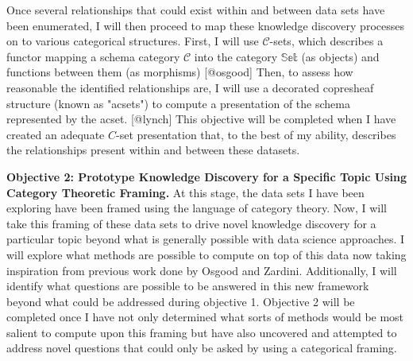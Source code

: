 \documentclass[11pt]{extarticle}
\begin{document}
Once several relationships that could exist within and between data sets have been enumerated, I will then proceed to map these knowledge discovery processes on to various categorical structures.
First, I will use $\mathscr{C}$-sets, which describes a functor mapping a schema category $\mathscr{C}$ into the category $\mathbb{Set}$ (as objects) and functions between them (as morphisms) [@osgood] %
Then, to assess how reasonable the identified relationships are, I will use a decorated copresheaf structure (known as "acsets") to compute a presentation of the schema represented by the acset. [@lynch]
This objective will be completed when I have created an adequate $C$-set presentation that, to the best of my ability, describes the relationships present within and between these datasets.


\textbf{Objective 2: Prototype Knowledge Discovery for a Specific Topic Using Category Theoretic Framing.} At this stage, the data sets I have been exploring have been framed using the language of category theory.
Now, I will take this framing of these data sets to drive novel knowledge discovery for a particular topic beyond what is generally possible with data science approaches.
I will explore what methods are possible to compute on top of this data now taking inspiration from previous work done by Osgood and Zardini. %
Additionally, I will identify what questions are possible to be answered in this new framework beyond what could be addressed during objective 1.
Objective 2 will be completed once I have not only determined what sorts of methods would be most salient to compute upon this framing but have also uncovered and attempted to address novel questions that could only be asked by using a categorical framing.
\end{document}
